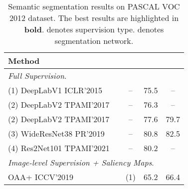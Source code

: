 \begin{table}[!tp]

  \centering
  \caption{Semantic segmentation results on PASCAL VOC 2012 dataset. The best results are highlighted in \textbf{bold}.  denotes supervision type.  denotes segmentation network. }
  \label{tab_voc_seg}
  \setlength{\tabcolsep}{2pt}
  \begin{tabular}{l|c|c|cc}
    \toprule
    {Method}                                           & {}                          & \multicolumn{1}{c|}{  } & {}       & {}                                                                                  \\  \midrule
    \multicolumn{5}{l}{\textit{Full Supervision}.}                                                                                                                                                                                     \\
    (1)  DeepLabV1 \tiny ICLR'2015 & \multirow{5}{*}{}    & \multicolumn{1}{c|}{ -- }     & 75.5          & --                                                                                        \\
    (2) DeepLabV2 \tiny TPAMI'2017                     &                                   & \multicolumn{1}{c|}{ -- }     & 76.3      & --                                                                                        \\
    (2) DeepLabV2 \tiny TPAMI'2017 &                                   & \multicolumn{1}{c|}{ -- }     & 77.6          & 79.7                                                                                      \\
    (3) WideResNet38 \tiny PR'2019                     &                                   & \multicolumn{1}{c|}{ -- }     & 80.8          & 82.5                                                                                      \\
    (4) Res2Net101 \tiny TPAMI'2021                     &                                   & \multicolumn{1}{c|}{ -- }     & 80.2          & --                                                                                      \\\midrule
    \multicolumn{5}{l}{\textit{Image-level Supervision + Saliency Maps}.}                                                                                                                                                              \\
    OAA+ \tiny ICCV'2019                               & \multirow{8}{*}{} & (1)                 & 65.2          & 66.4                                                                                      \\

\end{tabular}
\end{table}

